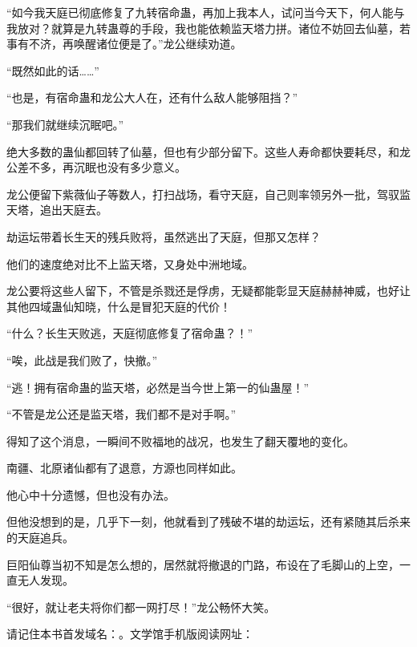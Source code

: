 \begin{this_body}
“如今我天庭已彻底修复了九转宿命蛊，再加上我本人，试问当今天下，何人能与我放对？就算是九转蛊尊的手段，我也能依赖监天塔力拼。诸位不妨回去仙墓，若事有不济，再唤醒诸位便是了。”龙公继续劝道。

“既然如此的话……”

“也是，有宿命蛊和龙公大人在，还有什么敌人能够阻挡？”

“那我们就继续沉眠吧。”

绝大多数的蛊仙都回转了仙墓，但也有少部分留下。这些人寿命都快要耗尽，和龙公差不多，再沉眠也没有多少意义。

龙公便留下紫薇仙子等数人，打扫战场，看守天庭，自己则率领另外一批，驾驭监天塔，追出天庭去。

劫运坛带着长生天的残兵败将，虽然逃出了天庭，但那又怎样？

他们的速度绝对比不上监天塔，又身处中洲地域。

龙公要将这些人留下，不管是杀戮还是俘虏，无疑都能彰显天庭赫赫神威，也好让其他四域蛊仙知晓，什么是冒犯天庭的代价！

“什么？长生天败逃，天庭彻底修复了宿命蛊？！”

“唉，此战是我们败了，快撤。”

“逃！拥有宿命蛊的监天塔，必然是当今世上第一的仙蛊屋！”

“不管是龙公还是监天塔，我们都不是对手啊。”

得知了这个消息，一瞬间不败福地的战况，也发生了翻天覆地的变化。

南疆、北原诸仙都有了退意，方源也同样如此。

他心中十分遗憾，但也没有办法。

但他没想到的是，几乎下一刻，他就看到了残破不堪的劫运坛，还有紧随其后杀来的天庭追兵。

巨阳仙尊当初不知是怎么想的，居然就将撤退的门路，布设在了毛脚山的上空，一直无人发现。

“很好，就让老夫将你们都一网打尽！”龙公畅怀大笑。

请记住本书首发域名：。文学馆手机版阅读网址：

\end{this_body}

